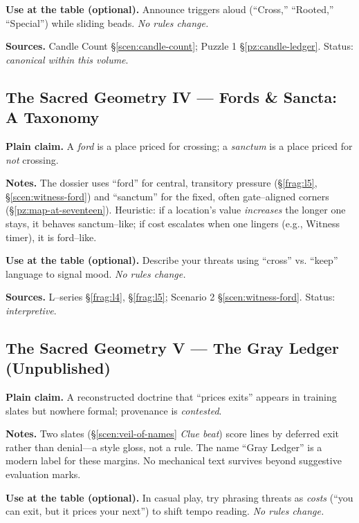 \documentclass[11pt]{article}
\begin{document}
\begin{itemize}
\medskip
\noindent\textbf{Use at the table (optional).} Announce triggers aloud (“Cross,” “Rooted,” “Special”) while sliding beads. \emph{No rules change.}

\medskip
\noindent\textbf{Sources.} Candle Count \S\ref{scen:candle-count}; Puzzle 1 \S\ref{pz:candle-ledger}. Status: \emph{canonical within this volume}.


\subsection{The Sacred Geometry IV — Fords \& Sancta: A Taxonomy}
\label{geometry:ford-vs-sanctum}

\noindent\textbf{Plain claim.} A \emph{ford} is a place priced for crossing; a \emph{sanctum} is a place priced for \emph{not} crossing.

\medskip
\noindent\textbf{Notes.} The dossier uses “ford” for central, transitory pressure (\S\ref{frag:l5}, \S\ref{scen:witness-ford}) and “sanctum” for the fixed, often gate–aligned corners (\S\ref{pz:map-at-seventeen}). Heuristic: if a location’s value \emph{increases} the longer one stays, it behaves sanctum–like; if cost escalates when one lingers (e.g., Witness timer), it is ford–like.

\medskip
\noindent\textbf{Use at the table (optional).} Describe your threats using “cross” vs. “keep” language to signal mood. \emph{No rules change.}

\medskip
\noindent\textbf{Sources.} L–series \S\ref{frag:l4}, \S\ref{frag:l5}; Scenario 2 \S\ref{scen:witness-ford}. Status: \emph{interpretive}.

\subsection{The Sacred Geometry V — The Gray Ledger (Unpublished)}
\label{geometry:gray-ledger}

\noindent\textbf{Plain claim.} A reconstructed doctrine that “prices exits” appears in training slates but nowhere formal; provenance is \emph{contested}.

\medskip
\noindent\textbf{Notes.} Two slates (\S\ref{scen:veil-of-names} \emph{Clue beat}) score lines by deferred exit rather than denial—a style gloss, not a rule. The name “Gray Ledger” is a modern label for these margins. No mechanical text survives beyond suggestive evaluation marks.

\medskip
\noindent\textbf{Use at the table (optional).} In casual play, try phrasing threats as \emph{costs} (“you can exit, but it prices your next”) to shift tempo reading. \emph{No rules change.}


\end{itemize}
\end{document}
